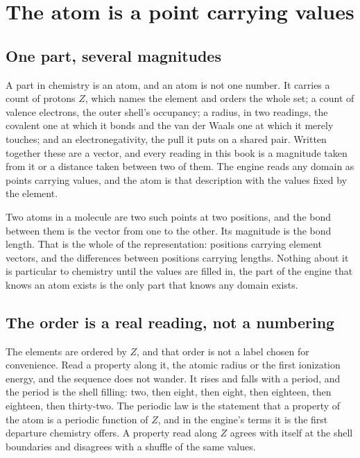 \chapter{The atom is a point carrying values}

\section{One part, several magnitudes}

A part in chemistry is an atom, and an atom is not one number. It carries a count of protons \(Z\),
which names the element and orders the whole set; a count of valence electrons, the outer
shell's occupancy; a radius, in two readings, the covalent one at which it bonds and the van der
Waals one at which it merely touches; and an electronegativity, the pull it puts on a shared pair.
Written together these are a vector, and every reading in this book is a magnitude taken from it or a
distance taken between two of them. The engine reads any domain as points carrying values, and the
atom is that description with the values fixed by the element.

Two atoms in a molecule are two such points at two positions, and the bond between them is the
vector from one to the other. Its magnitude is the bond length. That is the whole of the
representation: positions carrying element vectors, and the differences between positions carrying
lengths. Nothing about it is particular to chemistry until the values are filled in,  the
part of the engine that knows an atom exists is the only part that knows any domain exists.

\section{The order is a real reading, not a numbering}

The elements are ordered by \(Z\), and that order is not a label chosen for convenience. Read a
property along it, the atomic radius or the first ionization energy, and the sequence does not
wander. It rises and falls with a period, and the period is the shell filling: two, then eight, then
eight, then eighteen, then eighteen, then thirty-two. The periodic law is the statement that a
property of the atom is a periodic function of \(Z\), and in the engine's terms it is the first
departure chemistry offers. A property read along \(Z\) agrees with itself at the shell boundaries and
disagrees with a shuffle of the same values.

